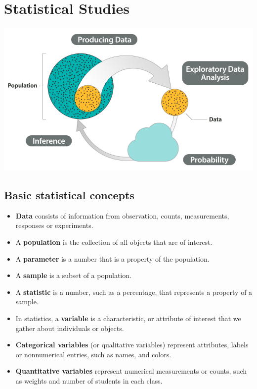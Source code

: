 
\section{Statistical Studies}

\includegraphics[scale=0.4]{Figures/Big-Picture.png}

\hypertarget{basic-statistical-concepts-14}{%
\subsection{Basic statistical concepts}\label{basic-statistical-concepts-14}}

\begin{itemize}
\item
  \textbf{Data} consists of information from observation, counts,
  measurements, responses or experiments.
\item
  A \textbf{population} is the collection of all objects that are of
  interest.
\item
  A \textbf{parameter} is a number that is a property of the population.
\item
  A \textbf{sample} is a subset of a population.
\item
  A \textbf{statistic} is a number, such as a percentage, that
  represents a property of a sample.
\item In statistics, a \textbf{variable} is a characteristic, or attribute
of interest that we gather about individuals or objects.
\item
  \textbf{Categorical variables} (or qualitative variables) represent
  attributes, labels or nonnumerical entries, such as names, and
  colors.
\item
  \textbf{Quantitative variables} represent numerical measurements or
  counts, such as weights and number of students in each class.
\end{itemize}

